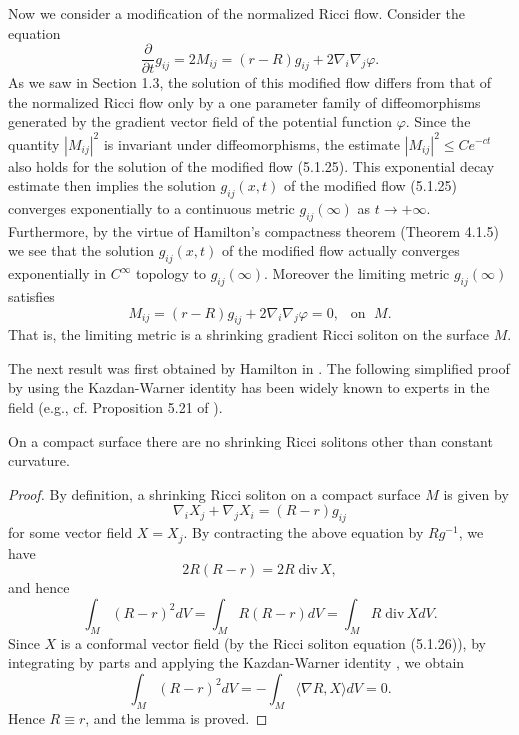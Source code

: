 Now we consider a modification of the normalized Ricci flow.
Consider the equation \begin{equation} \frac{\partial}{\partial
t}g_{ij}=2M_{ij}
=(r-R)g_{ij}+2\nabla_i\nabla_j\varphi. %
\end{equation} As we saw in Section 1.3, the solution of this modified flow
differs from that of the normalized Ricci flow only by a one
parameter family of diffeomorphisms generated by the gradient
vector field of the potential function $\varphi$. Since the
quantity $|M_{ij}|^2$ is invariant under diffeomorphisms, the
estimate $|M_{ij}|^2\leq Ce^{-ct}$ also holds for the solution of
the modified flow (5.1.25). This exponential decay estimate then
implies the solution $g_{ij}(x,t)$ of the modified flow (5.1.25)
converges exponentially to a continuous metric $g_{ij}(\infty)$ as
$t\rightarrow+\infty$. Furthermore, by the virtue of Hamilton's
compactness theorem (Theorem 4.1.5) we see that the solution
$g_{ij}(x,t)$ of the modified flow actually converges
exponentially in $C^\infty$ topology to $g_{ij}(\infty)$. Moreover
the limiting metric $g_{ij}(\infty)$ satisfies
$$
M_{ij}=(r-R)g_{ij}+2\nabla_i\nabla_j\varphi=0,\ \ \mbox{ on }\; M.
$$
That is, the limiting metric is a shrinking gradient Ricci soliton
on the surface $M$.

The next result was first obtained by Hamilton in \cite{Ha88}. The
following simplified proof by using the Kazdan-Warner identity has
been widely known to experts in the field (e.g., cf. Proposition
5.21 of \cite{CK04}).

\begin{proposition} 
  \label{prop:cz-compact-shrinking-surface-soliton-rigidity}

On a compact surface there are no shrinking Ricci solitons other
than constant curvature.
\end{proposition}

\begin{proof}
By definition, a shrinking Ricci soliton on a compact surface $M$
is given by \begin{equation}
\nabla_iX_j+\nabla_jX_i=(R-r)g_{ij} %
\end{equation} for some vector field $X={X_j}$. By contracting the above
equation by $Rg^{-1}$, we have
$$
2R(R-r)=2R\; \text{div}\, X,
$$
and hence
$$
\int_M(R-r)^2 dV=\int_MR(R-r)dV=\int_M R\; \text{div}\, X dV.
$$
Since $X$ is a conformal vector field (by the Ricci soliton
equation (5.1.26)), by integrating by parts and applying the
Kazdan-Warner identity \cite{KW}, we obtain
$$
\int_M(R-r)^2 dV=-\int_M\langle\nabla R,X\rangle dV=0.
$$
Hence $R\equiv r$, and the lemma is proved.
\end{proof}

